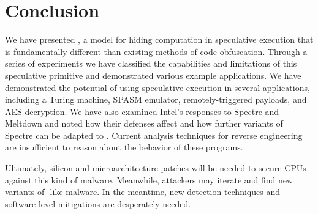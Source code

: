 
\section{Conclusion}

We have presented \speculake, a model for hiding computation in speculative
execution that is fundamentally different than existing methods of code
obfuscation. Through a series of experiments we have classified the capabilities
and limitations of this speculative primitive and demonstrated various example
applications. We have demonstrated the potential of using speculative execution
in several applications, including a Turing machine, SPASM emulator,
remotely-triggered payloads, and AES decryption. We have also examined Intel's
responses to Spectre and Meltdown and noted how their defenses affect \speculake
and how further variants of Spectre can be adapted to \speculake. Current
analysis techniques for reverse engineering are insufficient to reason about the
behavior of these programs.


Ultimately, silicon and microarchitecture patches will be needed to secure CPUs
against this kind of malware. Meanwhile, attackers may
iterate and find new variants of \speculake-like malware.
In the meantime, new detection techniques and
software-level mitigations are desperately needed.

%
